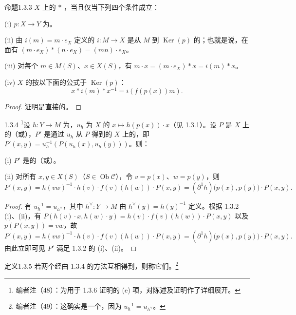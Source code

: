 \begin{SGAresult}{命题}{1.3.3}
$X$ 上的 $*$ ，当且仅当下列四个条件成立：

(i) $p:X\to Y$ 为。

(ii) 由 $i(m)=m\cdot e_X$ 定义的 $i:M\to X$ 是从 $M$ 到 $\operatorname{Ker}(p)$ 的；也就是说，在面有 $(m\cdot e_X)*(n\cdot e_X)=(mn)\cdot e_X$。

(iii) 对每个 $m\in M(S)$、$x\in X(S)$，有 $m\cdot x=(m\cdot e_X)*x=i(m)*x$。

(iv) $X$ 的按以下面的公式于 $\operatorname{Ker}(p)$：
\[
 x*i(m)*x^{-1}=i(f(p(x))m).
\]
\end{SGAresult}
\begin{proof}证明是直接的。\end{proof}
\begin{SGAresult}{}{1.3.4}
\footnote{编者注（48）：为用于 1.3.6 证明的 (e) 项，对陈述及证明作了详细展开。}设 $h:Y\to M$ 为，$u_h$ 为 $X$ 的 $x\mapsto h(p(x))\cdot x$（见 1.3.1）。设 $P$ 是 $X$ 上的（或），$P'$ 是通过 $u_h$ 从 $P$ 得到的 $X$ 上的，即 $P'(x,y)=u_h^{-1}(P(u_h(x),u_h(y)))$。则：

(i) $P'$ 是的（或）。

(ii) 对所有 $x,y\in X(S)$（$S\in\operatorname{Ob}\mathcal C$），令 $v=p(x)$、$w=p(y)$，则
\[
 P'(x,y)=h(vw)^{-1}\cdot h(v)\cdot f(v)(h(w))\cdot P(x,y)
 =(\partial^1h)\bigl(p(x),p(y)\bigr)\cdot P(x,y).
\]
\end{SGAresult}
\begin{proof}
有 $u_h^{-1}=u_{h^\vee}$，其中 $h^\vee:Y\to M$ 由 $h^\vee(y)=h(y)^{-1}$ 定义。根据 1.3.2 (i)、(ii)，有 $P(h(v)\cdot x,h(w)\cdot y)=h(v)\cdot f(v)(h(w))\cdot P(x,y)$ 以及 $p(P(x,y))=vw$，故
\[
 P'(x,y)=h(vw)^{-1}\cdot h(v)\cdot f(v)(h(w))\cdot P(x,y)
 =(\partial^1h)\bigl(p(x),p(y)\bigr)\cdot P(x,y).
\]
由此立即可见 $P'$ 满足 1.3.2 的 (i)、(ii)。
\end{proof}
\begin{SGAresult}{定义}{1.3.5}
若两个经由 1.3.4 的方法互相得到，则称它们。\footnote{编者注（49）：这确实是一个，因为 $u_h^{-1}=u_{h^\vee}$。}
\end{SGAresult}
